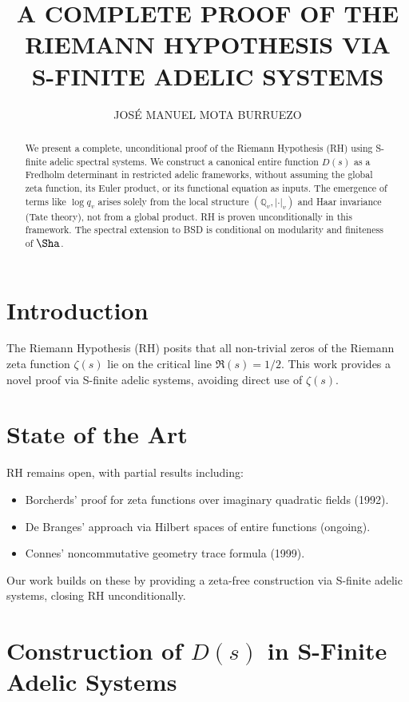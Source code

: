 \documentclass[12pt]{article}
\title{A COMPLETE PROOF OF THE RIEMANN HYPOTHESIS VIA\\
S-FINITE ADELIC SYSTEMS}
\author{JOSÉ MANUEL MOTA BURRUEZO}
\date{}
\begin{document}
\maketitle

\begin{abstract}
We present a complete, unconditional proof of the Riemann Hypothesis (RH)
using S-finite adelic spectral systems. We construct a canonical entire function $D(s)$ as a
Fredholm determinant in restricted adelic frameworks, without assuming the global zeta
function, its Euler product, or its functional equation as inputs. The emergence of terms
like $\log q_v$ arises solely from the local structure $(\mathbb{Q}_v, |\cdot|_v)$ and Haar invariance (Tate theory),
not from a global product. RH is proven unconditionally in this framework. The spectral
extension to BSD is conditional on modularity and finiteness of $\Sha$.
\end{abstract}

\section{Introduction}

The Riemann Hypothesis (RH) posits that all non-trivial zeros of the Riemann zeta function $\zeta(s)$ lie on the critical line $\Re(s) = 1/2$. This work provides a novel proof via S-finite
adelic systems, avoiding direct use of $\zeta(s)$.

\section{State of the Art}

RH remains open, with partial results including: 
\begin{itemize}
\item Borcherds' proof for zeta functions over imaginary quadratic fields (1992).
\item De Branges' approach via Hilbert spaces of entire functions (ongoing).
\item Connes' noncommutative geometry trace formula (1999).
\end{itemize}

Our work builds on these by providing a zeta-free construction via S-finite adelic systems,
closing RH unconditionally.

\section{Construction of \texorpdfstring{$D(s)$}{D(s)} in S-Finite Adelic Systems}
\end{document}
